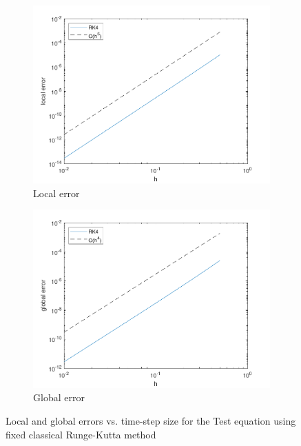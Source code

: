 \begin{figure}[H]
\centering
    \begin{subfigure}{0.49\linewidth}
        \includegraphics[width=\linewidth]{images/5/5_3_localerror.pdf}
        \caption{Local error}
    \end{subfigure}
    \begin{subfigure}{0.49\linewidth}
        \includegraphics[width=\linewidth]{images/5/5_3_globalerror.pdf}
        \caption{Global error}
    \end{subfigure}
    \caption{Local and global errors vs. time-step size for the Test equation using fixed classical Runge-Kutta method}
    \label{5_3_TE_errors}
\end{figure}

